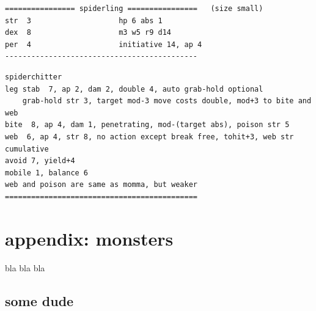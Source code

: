 \small \begin{samepage} \begin{verbatim}
================ spiderling ================   (size small)
str  3                    hp 6 abs 1
dex  8                    m3 w5 r9 d14
per  4                    initiative 14, ap 4
--------------------------------------------
\end{verbatim} \end{samepage} \goodbreak \begin{samepage} \begin{verbatim}
spiderchitter
leg stab  7, ap 2, dam 2, double 4, auto grab-hold optional
    grab-hold str 3, target mod-3 move costs double, mod+3 to bite and web
bite  8, ap 4, dam 1, penetrating, mod-(target abs), poison str 5
web  6, ap 4, str 8, no action except break free, tohit+3, web str cumulative
avoid 7, yield+4
mobile 1, balance 6
web and poison are same as momma, but weaker
============================================
\end{verbatim} \end{samepage} \normalsize


































\clearpage
\section*{appendix: monsters}

\raggedbottom

bla bla bla



\goodbreak 
\subsection*{some dude}

